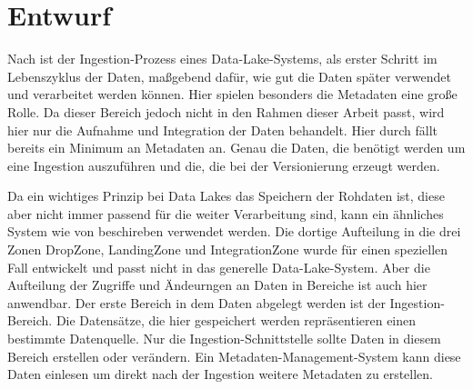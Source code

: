 \chapter{Entwurf}
Nach \textcite{ingestion_01} ist der Ingestion-Prozess eines Data-Lake-Systems, als erster Schritt im Lebenszyklus der Daten, maßgebend dafür, wie gut die Daten später verwendet und verarbeitet werden können.
Hier spielen besonders die Metadaten eine große Rolle.
Da dieser Bereich jedoch nicht in den Rahmen dieser Arbeit passt, wird hier nur die Aufnahme und Integration der Daten behandelt.
Hier durch fällt bereits ein Minimum an Metadaten an.
Genau die Daten, die benötigt werden um eine Ingestion auszuführen und die, die bei der Versionierung erzeugt werden.

Da ein wichtiges Prinzip bei Data Lakes das Speichern der Rohdaten ist, diese aber nicht immer passend für die weiter Verarbeitung sind, kann ein ähnliches System wie von \textcite{ingestion_02} beschireben verwendet werden.
Die dortige Aufteilung in die drei Zonen DropZone, LandingZone und IntegrationZone wurde für einen speziellen Fall entwickelt und passt nicht in das generelle Data-Lake-System.
Aber die Aufteilung der Zugriffe und Ändeurngen an Daten in Bereiche ist auch hier anwendbar.
Der erste Bereich in dem Daten abgelegt werden ist der Ingestion-Bereich.
Die Datensätze, die hier gespeichert werden repräsentieren einen bestimmte Datenquelle.
Nur die Ingestion-Schnittstelle sollte Daten in diesem Bereich erstellen oder verändern.
Ein Metadaten-Management-System kann diese Daten einlesen um direkt nach der Ingestion weitere Metadaten zu erstellen.






